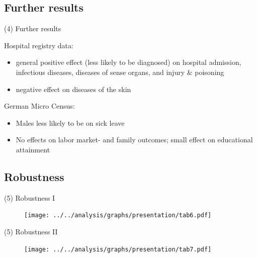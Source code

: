 \documentclass[aspectratio=169,handout]{beamer} %
\begin{document}
\subsection{Further results}
\label{BACK_FROM_MZ}
\begin{frame}{(4) Further results}

\begin{block}{Hospital registry data:}
\begin{itemize}
\item general positive effect (less likely to be diagnosed) on hospital admission, infectious diseases, diseases of sense organs, and injury \& poisoning
\item negative effect on diseases of the skin
\end{itemize}
\end{block}
\hyperlink{OTHER_CHAPTERS}{}

\begin{block}{German Micro Census:}
\begin{itemize}
\item Males less likely to be on sick leave
\item No effects on labor market- and family outcomes; small effect on educational attainment
\end{itemize}
\end{block}
\hyperlink{MZ}{}
\end{frame}
\subsection{Robustness}
\begin{frame}{(5) Robustness I}
\begin{figure}
	\texttt{[image: ../../analysis/graphs/presentation/tab6.pdf]}
\end{figure}
\end{frame}
\begin{frame}{(5) Robustness II}
\begin{figure}
	\texttt{[image: ../../analysis/graphs/presentation/tab7.pdf]}
\end{figure}
\end{frame}
\end{document}
